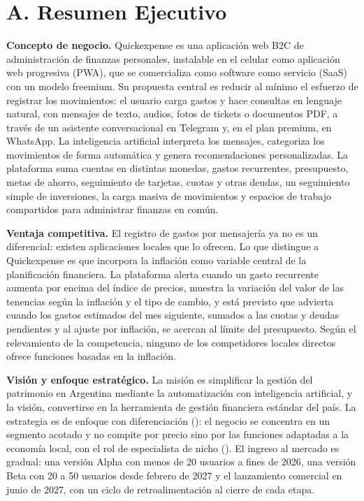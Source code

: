 \clearpage

\section*{A. Resumen Ejecutivo}\label{a.-resumen-ejecutivo}

\textbf{Concepto de negocio.} Quickexpense es una aplicación web B2C de
administración de finanzas personales, instalable en el celular como
aplicación web progresiva (PWA), que se comercializa como software como
servicio (SaaS) con un modelo freemium. Su propuesta central es reducir
al mínimo el esfuerzo de registrar los movimientos: el usuario carga
gastos y hace consultas en lenguaje natural, con mensajes de texto,
audios, fotos de tickets o documentos PDF, a través de un asistente
conversacional en Telegram y, en el plan premium, en WhatsApp. La
inteligencia artificial interpreta los mensajes, categoriza los
movimientos de forma automática y genera recomendaciones personalizadas.
La plataforma suma cuentas en distintas monedas, gastos recurrentes,
presupuesto, metas de ahorro, seguimiento de tarjetas, cuotas y otras
deudas, un seguimiento simple de inversiones, la carga masiva de
movimientos y espacios de trabajo compartidos para administrar finanzas
en común.

\textbf{Ventaja competitiva.} El registro de gastos por mensajería ya no
es un diferencial: existen aplicaciones locales que lo ofrecen. Lo que
distingue a Quickexpense es que incorpora la inflación como variable
central de la planificación financiera. La plataforma alerta cuando un
gasto recurrente aumenta por encima del índice de precios, muestra la
variación del valor de las tenencias según la inflación y el tipo de
cambio, y está previsto que advierta cuando los gastos estimados del mes
siguiente, sumados a las cuotas y deudas pendientes y al ajuste por
inflación, se acercan al límite del presupuesto. Según el relevamiento
de la competencia, ninguno de los competidores locales directos ofrece
funciones basadas en la inflación.

\textbf{Visión y enfoque estratégico.} La misión es simplificar la
gestión del patrimonio en Argentina mediante la automatización con
inteligencia artificial, y la visión, convertirse en la herramienta de
gestión financiera estándar del país. La estrategia es de enfoque con
diferenciación (): el negocio se
concentra en un segmento acotado y no compite por precio sino por las
funciones adaptadas a la economía local, con el rol de especialista de
nicho (). El ingreso al
mercado es gradual: una versión Alpha con menos de 20 usuarios a fines
de 2026, una versión Beta con 20 a 50 usuarios desde febrero de 2027 y
el lanzamiento comercial en junio de 2027, con un ciclo de
retroalimentación al cierre de cada etapa.

